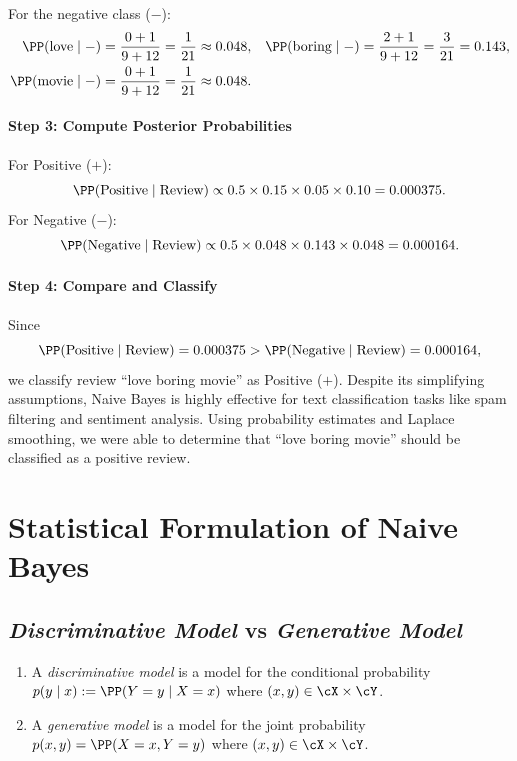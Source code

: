 For the negative class ($-$):
\begin{align}
  \PP(\text{love}\mid -) &= \frac{0+1}{9+12}=\frac{1}{21}\approx 0.048,
  & \PP(\text{boring}\mid -) &= \frac{2+1}{9+12}=\frac{3}{21}=0.143,
    \label{eq:ch6-likel-neg-1}\\
  \PP(\text{movie}\mid -) &= \frac{0+1}{9+12}=\frac{1}{21}\approx 0.048. & &
    \label{eq:ch6-likel-neg-2}
\end{align}

\paragraph{Step 3: Compute Posterior Probabilities}
For Positive ($+$):
\[
  \PP(\text{Positive}\mid\text{Review})\propto
  0.5\times 0.15\times 0.05\times 0.10 = 0.000375.
\]
For Negative ($-$):
\[
  \PP(\text{Negative}\mid\text{Review})\propto
  0.5\times 0.048\times 0.143\times 0.048 = 0.000164.
\]

\paragraph{Step 4: Compare and Classify}
Since
\[
  \PP(\text{Positive}\mid\text{Review})=0.000375 >
  \PP(\text{Negative}\mid\text{Review})=0.000164,
\]
we classify review ``love boring movie'' as Positive ($+$). Despite its
simplifying assumptions, Naive Bayes is highly effective for text
classification tasks like spam filtering and sentiment analysis. Using
probability estimates and Laplace smoothing, we were able to determine that
``love boring movie'' should be classified as a positive review.

\section{Statistical Formulation of Naive Bayes}
\label{sec:ch6-statistical}

\subsection{\emph{Discriminative Model} vs \emph{Generative Model}}
\label{subsec:ch6-disc-vs-gen}

\begin{definition}\label{def:ch6-disc-gen}
\begin{enumerate}
  \item A \emph{discriminative model} is a model for the conditional
        probability $p(y\mid x):=\PP(Y=y\mid X=x)$ where
        $(x,y)\in\cX\times\cY$.
  \item A \emph{generative model} is a model for the joint probability
        $p(x,y)=\PP(X=x,Y=y)$ where $(x,y)\in\cX\times\cY$.
\end{enumerate}
\end{definition}

